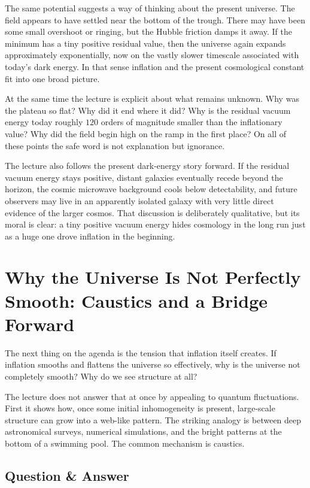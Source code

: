 The same potential suggests a way of thinking about the present universe. The field appears to have settled near the bottom of the trough. There may have been some small overshoot or ringing, but the Hubble friction damps it away. If the minimum has a tiny positive residual value, then the universe again expands approximately exponentially, now on the vastly slower timescale associated with today's dark energy. In that sense inflation and the present cosmological constant fit into one broad picture.

At the same time the lecture is explicit about what remains unknown. Why was the plateau so flat? Why did it end where it did? Why is the residual vacuum energy today roughly \(120\) orders of magnitude smaller than the inflationary value? Why did the field begin high on the ramp in the first place? On all of these points the safe word is not explanation but ignorance.

The lecture also follows the present dark-energy story forward. If the residual vacuum energy stays positive, distant galaxies eventually recede beyond the horizon, the cosmic microwave background cools below detectability, and future observers may live in an apparently isolated galaxy with very little direct evidence of the larger cosmos. That discussion is deliberately qualitative, but its moral is clear: a tiny positive vacuum energy hides cosmology in the long run just as a huge one drove inflation in the beginning.

\section{Why the Universe Is Not Perfectly Smooth: Caustics and a Bridge Forward}

The next thing on the agenda is the tension that inflation itself creates. If inflation smooths and flattens the universe so effectively, why is the universe not completely smooth? Why do we see structure at all?

The lecture does not answer that at once by appealing to quantum fluctuations. First it shows how, once some initial inhomogeneity is present, large-scale structure can grow into a web-like pattern. The striking analogy is between deep astronomical surveys, numerical simulations, and the bright patterns at the bottom of a swimming pool. The common mechanism is caustics.

\subsection{Question \& Answer}

